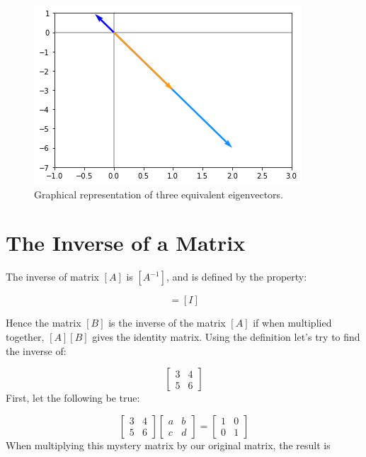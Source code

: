 \begin{figure}[htb]
	\centering
	\includegraphics[width=0.7\linewidth]{figures/eigenvectors}
	\caption{Graphical representation of three equivalent eigenvectors.}
	\label{fig:eigenvectors}
\end{figure}

\section{The Inverse of a Matrix}
\label{the-inverse-of-a-matrix}

The inverse of matrix $[A]$ is $[A^{-1}]$, and is defined by the property:

\begin{equation} 
[A][A^{-1}]=[I] 
\end{equation}

Hence the matrix $[B]$ is the inverse of the matrix $[A]$ if when multiplied together, $[A][B]$ gives the identity matrix. 
Using the definition let's try to find the inverse of:

\begin{equation*}
\begin{bmatrix}
3 & 4\\
5 & 6
\end{bmatrix}
\end{equation*}
First, let the following be true:

\begin{equation*}
\begin{bmatrix}
3 & 4\\
5 & 6
\end{bmatrix}
\begin{bmatrix}
a & b\\
c & d
\end{bmatrix}
=
\begin{bmatrix}
1 & 0\\
0 & 1
\end{bmatrix}
\end{equation*}
When multiplying this mystery matrix by our original matrix, the result is

